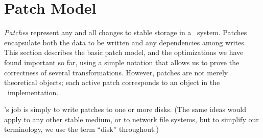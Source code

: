 
\newcommand{\ChAll}{\ensuremath{\textit{All}}}
\newcommand{\ChAllB}[1]{\ensuremath{\textit{All}[#1]}}
\newcommand{\ChMem}{\ensuremath{\textit{Mem}}}
\newcommand{\ChMemB}[1]{\ensuremath{\textit{Mem}[#1]}}
\newcommand{\ChDisk}{\ensuremath{\textit{Disk}}}
\newcommand{\ChDiskB}[1]{\ensuremath{\textit{Disk}[#1]}}
\newcommand{\ChInf}{\ensuremath{\textit{Inf}}}
\newcommand{\ChInfB}[1]{\ensuremath{\textit{Inf\/}[#1]}}
\newcommand{\ChRb}{\ensuremath{\textit{\Rb}}}
\newcommand{\ChRbB}[1]{\ensuremath{\textit{\Rb}[#1]}}
\newcommand{\ChNrb}{\ensuremath{\textit{\Nrb}}}
\newcommand{\ChNrbB}[1]{\ensuremath{\textit{\Nrb}[#1]}}
\newcommand{\ChNoop}{\ensuremath{\textit{\Noop}}}

\newcommand{\Before}[1]{\ensuremath{\textit{Pre}[#1]}}
\newcommand{\BeforeS}[1]{\ensuremath{\textit{Pre}^*[#1]}}
\newcommand{\After}[1]{\ensuremath{\textit{Post}[#1]}}
\newcommand{\AfterS}[1]{\ensuremath{\textit{Post}^*[#1]}}

\newcommand{\statenone}{\ensuremath{\textit{inmem}}}
\newcommand{\stateinf}{\ensuremath{\textit{inflight}}}
\newcommand{\statedisk}{\ensuremath{\textit{ondisk}}}



\section{Patch Model}
\label{sec:patch}

\emph{Patches} represent any and all changes to stable storage in a \Kudos\
system.
%
Patches encapsulate both the data to be written and any dependencies among
writes.
%
This section describes the basic patch model, and the optimizations we have
found important so far, using a simple notation that allows us to prove the
correctness of several transformations.
%
However, patches are not merely theoretical objects; each active patch
corresponds to an object in the \Kudos\ implementation.



\Kudos's job is simply to write patches to one or more disks.
%
(The same ideas would apply to any other stable medium, or to network file
systems, but to simplify our terminology, we use the term ``disk''
throughout.)

